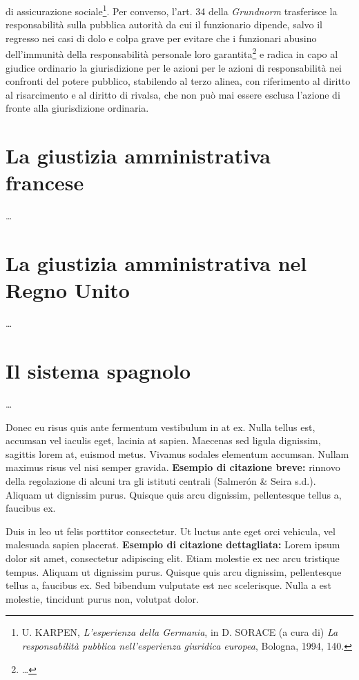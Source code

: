 \documentclass[12pt,it,a4paper,]{report}
\begin{document}
di assicurazione sociale\footnote{U. KARPEN, \emph{L'esperienza della
  Germania}, in D. SORACE (a cura di) \emph{La responsabilità pubblica
  nell'esperienza giuridica europea}, Bologna, 1994, 140.}. Per
converso, l'art. 34 della \emph{Grundnorm} trasferisce la responsabilità
sulla pubblica autorità da cui il funzionario dipende, salvo il regresso
nei casi di dolo e colpa grave per evitare che i funzionari abusino
dell'immunità della responsabilità personale loro garantita\footnote{\ldots{}}
e radica in capo al giudice ordinario la giurisdizione per le azioni per
le azioni di responsabilità nei confronti del potere pubblico,
stabilendo al terzo alinea, con riferimento al diritto al risarcimento e
al diritto di rivalsa, che non può mai essere esclusa l'azione di fronte
alla giurisdizione ordinaria.

\hypertarget{la-giustizia-amministrativa-francese}{%
\chapter{La giustizia amministrativa
francese}\label{la-giustizia-amministrativa-francese}}

\ldots{}

\hypertarget{la-giustizia-amministrativa-nel-regno-unito}{%
\chapter{La giustizia amministrativa nel Regno
Unito}\label{la-giustizia-amministrativa-nel-regno-unito}}

\ldots{}

\hypertarget{il-sistema-spagnolo}{%
\chapter{Il sistema spagnolo}\label{il-sistema-spagnolo}}

\ldots{}

\newpage

Donec eu risus quis ante fermentum vestibulum in at ex. Nulla tellus
est, accumsan vel iaculis eget, lacinia at sapien. Maecenas sed ligula
dignissim, sagittis lorem at, euismod metus. Vivamus sodales elementum
accumsan. Nullam maximus risus vel nisi semper gravida. \textbf{Esempio
di citazione breve:} rinnovo della regolazione di alcuni tra gli
istituti centrali (Salmerón \& Seira s.d.). Aliquam ut dignissim purus.
Quisque quis arcu dignissim, pellentesque tellus a, faucibus ex.

Duis in leo ut felis porttitor consectetur. Ut luctus ante eget orci
vehicula, vel malesuada sapien placerat. \textbf{Esempio di citazione
dettagliata:} Lorem ipsum dolor sit amet, consectetur adipiscing elit.
Etiam molestie ex nec arcu tristique tempus. Aliquam ut dignissim purus.
Quisque quis arcu dignissim, pellentesque tellus a, faucibus ex. Sed
bibendum vulputate est nec scelerisque. Nulla a est molestie, tincidunt
purus non, volutpat dolor.
\end{document}
